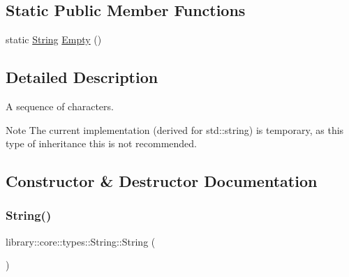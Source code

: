 \subsection*{Static Public Member Functions}
\begin{DoxyCompactItemize}
\item 
static \hyperlink{classlibrary_1_1core_1_1types_1_1_string}{String} \hyperlink{classlibrary_1_1core_1_1types_1_1_string_a4d359cb0dba46e14ca46f90e728c2b96}{Empty} ()
\end{DoxyCompactItemize}


\subsection{Detailed Description}
A sequence of characters. 

\begin{DoxyNote}{Note}
The current implementation (derived for std\+::string) is temporary, as this type of inheritance this is not recommended. 
\end{DoxyNote}


\subsection{Constructor \& Destructor Documentation}
\mbox{\label{classlibrary_1_1core_1_1types_1_1_string_ab49dec039a75f0049c95759141b6d484}} 
\subsubsection{\texorpdfstring{String()}{String()}\hspace{0.1cm}{\footnotesize\ttfamily [1/2]}}
{\footnotesize\ttfamily library\+::core\+::types\+::\+String\+::\+String (\begin{DoxyParamCaption}{ }\end{DoxyParamCaption})}

\mbox{\label{classlibrary_1_1core_1_1types_1_1_string_a37c737528805786c49eab397ba7b64ae}} 
